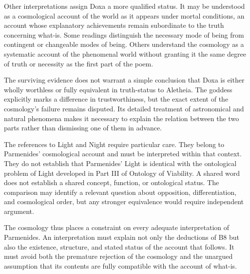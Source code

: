 Other interpretations assign Doxa a more
qualified status. It may be understood as
a cosmological account of the world as it
appears under mortal conditions, an account
whose explanatory achievements remain
subordinate to the truth concerning what-is.
Some readings distinguish the necessary
mode of being from contingent or changeable
modes of being. Others understand the
cosmology as a systematic account of the
phenomenal world without granting it the
same degree of truth or necessity as the
first part of the poem.


The surviving evidence does not warrant
a simple conclusion that Doxa is either
wholly worthless or fully equivalent in
truth-status to Aletheia. The goddess
explicitly marks a difference in trustworthiness,
but the exact extent of the cosmology's
failure remains disputed. Its detailed
treatment of astronomical and natural
phenomena makes it necessary to explain
the relation between the two parts rather
than dismissing one of them in advance.


The references to Light and Night require
particular care. They belong to Parmenides'
cosmological account and must be interpreted
within that context. They do not establish
that Parmenides' Light is identical with the
ontological problem of Light developed in
Part III of Ontology of Viability. A shared
word does not establish a shared concept,
function, or ontological status. The comparison
may identify a relevant question about
opposition, differentiation, and cosmological
order, but any stronger equivalence would
require independent argument.


The cosmology thus places a constraint on
every adequate interpretation of Parmenides.
An interpretation must explain not only
the deductions of B8 but also the existence,
structure, and stated status of the account
that follows. It must avoid both the
premature rejection of the cosmology and
the unargued assumption that its contents
are fully compatible with the account of
what-is.


